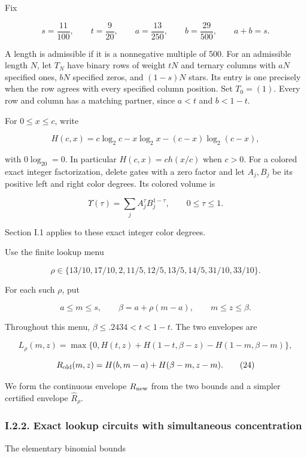 Fix

\[
s=\frac{11}{100},\qquad t=\frac9{20},\qquad
a=\frac{13}{250},\qquad b=\frac{29}{500},\qquad a+b=s.
\]

A length is admissible if it is a nonnegative multiple of 500. For an admissible length \(N\), let \(T_N\) have binary rows of weight \(tN\) and ternary columns with \(aN\) specified ones, \(bN\) specified zeros, and \((1-s)N\) stars. Its entry is one precisely when the row agrees with every specified column position. Set \(T_0=(1)\). Every row and column has a matching partner, since \(a<t\) and \(b<1-t\).

For \(0\le x\le c\), write

\[
H(c,x)=c\log_2c-x\log_2x-(c-x)\log_2(c-x),
\]

with \(0\log_20=0\). In particular \(H(c,x)=c h(x/c)\) when \(c>0\). For a colored exact integer factorization, delete gates with a zero factor and let \(A_j,B_j\) be its positive left and right color degrees. Its colored volume is

\[
\Upsilon(\tau)=\sum_j A_j^\tau B_j^{1-\tau},\qquad 0\le\tau\le1.
\]

Section I.1 applies to these exact integer color degrees.

Use the finite lookup menu

\[
\rho\in\{13/10,17/10,2,11/5,12/5,13/5,14/5,31/10,33/10\}.
\]

For each such \(\rho\), put

\[
a\le m\le s,\qquad \beta=a+\rho(m-a),\qquad m\le z\le\beta.
\tag{23}
\]

Throughout this menu, \(\beta\le .2434<t<1-t\). The two envelopes are

\[
L_\rho(m,z)=\max\{0,H(t,z)+H(1-t,\beta-z)-H(1-m,\beta-m)\},
\]

\[
R_{\rm old}(m,z)=H(b,m-a)+H(\beta-m,z-m).
\tag{24}
\]

We form the continuous envelope \(R_{\rm new}\) from the two bounds and a simpler certified envelope \(\widehat R_\rho\).

\hypertarget{af-a9ec399514-i.2.2.-exact-lookup-circuits-with-simultaneous-concentration}{%
\subsubsection{I.2.2. Exact lookup circuits with simultaneous concentration}\label{af-a9ec399514-i.2.2.-exact-lookup-circuits-with-simultaneous-concentration}}

The elementary binomial bounds

